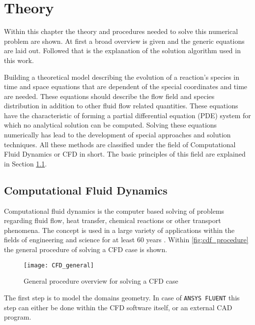 \documentclass[../thesis.tex]{subfiles}
\begin{document}
\chapter{Theory}
\label{chp:theory}

Within this chapter the theory and procedures needed to solve this numerical problem are shown. At first a broad overview is given and the generic equations are laid out. Followed that is the explanation of the solution algorithm used in this work.

Building a theoretical model describing the evolution of a reaction's species in time and space equations that are dependent of the special coordinates and time are needed. These equations should describe the flow field and species distribution in addition to other fluid flow related quantities. These equations have the characteristic of forming a partial differential equation (PDE) system for which no analytical solution can be computed. Solving these equations numerically has lead to the development of special approaches and solution techniques. All these methods are classified under the field of Computational Fluid Dynamics or CFD in short. The basic principles of this field are explained in Section \ref{sec: CFD}. 
 
\section{Computational Fluid Dynamics}
\label{sec: CFD}

Computational fluid dynamics is the computer based solving of problems regarding fluid flow, heat transfer, chemical reactions or other transport phenomena. The concept is used in a large variety of applications within the fields of engineering and science for at least 60 years \cite{versteeg2007introduction}. Within \autoref{fig:cdf_procedure} the general procedure of solving a CFD case is shown.
\begin{figure}[htbp]
	\centering
	\texttt{[image: CFD\_general]}
	\caption{General procedure overview for solving a CFD case}
	\label{fig:cdf_procedure}
\end{figure}

The first step is to model the domains geometry. In case of \texttt{ANSYS FLUENT} this step can either be done within the CFD software itself, or an external CAD program. 
\end{document}
